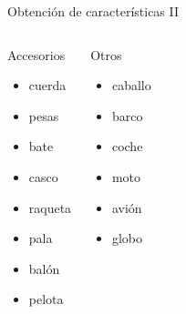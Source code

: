 \begin{frame}{Obtención de características II}
 \begin{columns}[t]
  \begin{block}{Accesorios}
   	\begin{itemize}
	\item cuerda
	\item pesas
	\item bate
	\item casco
	\item raqueta
	\item pala
	\item balón
	\item pelota
	\end{itemize}
  \end{block}
  \begin{block}{Otros}
  	\begin{itemize}
	\item caballo
	\item barco
	\item coche
	\item moto
	\item avión
	\item globo
	\end{itemize}
  \end{block}
 \end{columns}
\end{frame}
